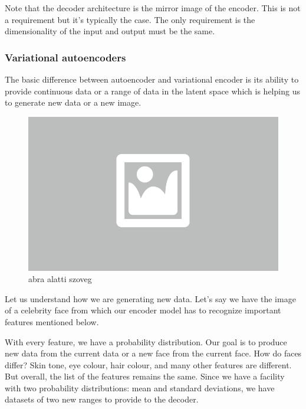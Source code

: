 Note that the decoder architecture is the mirror image of the encoder. This is not a requirement but it’s typically the case. The only requirement is the dimensionality of the input and output must be the same.

\subsubsection{Variational autoencoders}




The basic difference between autoencoder and variational encoder is its ability to provide continuous data or a range of data in the latent space which is helping us to generate new data or a new image.

\begin{figure}[ht]
	\centering
	\includegraphics[width=0.65\columnwidth]{figures/abra.png}
	\caption{abra alatti szoveg}
\end{figure}

Let us understand how we are generating new data. Let’s say we have the image of a celebrity face from which our encoder model has to recognize important features mentioned below. 

With every feature, we have a probability distribution. Our goal is to produce new data from the current data or a new face from the current face. How do faces differ? Skin tone, eye colour, hair colour, and many other features are different. But overall, the list of the features remains the same. Since we have a facility with two probability distributions: mean and standard deviations, we have datasets of two new ranges to provide to the decoder.

